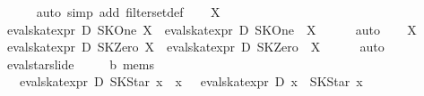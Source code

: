 \begin{isabellebody}
\ \ \ \ \isamarkupfalse%
\ {}auto\ simp\ add{}\ filter{}set{}def{}\isanewline
{}\isamarkupfalse%
\isanewline
\ \ \isamarkupfalse%
\ X\isanewline
\ \ \isamarkupfalse%
\ {}eval{}skat{}expr\ D\ SKOne\ {}{}X{}\ {}\ {}eval{}skat{}expr\ D\ SKOne\ {}\ X{}\isanewline
\ \ \ \ \isamarkupfalse%
\ auto\isanewline
{}\isamarkupfalse%
\isanewline
\ \ \isamarkupfalse%
\ X\isanewline
\ \ \isamarkupfalse%
\ {}eval{}skat{}expr\ D\ SKZero\ {}{}X{}\ {}\ {}eval{}skat{}expr\ D\ SKZero\ {}\ X{}\isanewline
\ \ \ \ \isamarkupfalse%
\ auto\isanewline
{}\isamarkupfalse%
%
\endisatagproof
{\isafoldproof}%
%
\isadelimproof
\isanewline
%
\endisadelimproof
\isanewline
{}\isamarkupfalse%
\ eval{}star{}slide{}\isanewline
\ \ \ {}\ {}{}\ {}{}b\ mems{}\isanewline
\ \ \ {}eval{}skat{}expr\ D\ {}SKStar\ x\ {}\ x{}\ {}\ {}\ eval{}skat{}expr\ D\ {}x\ {}\ SKStar\ x{}\ {}{}\isanewline

\end{isabellebody}
